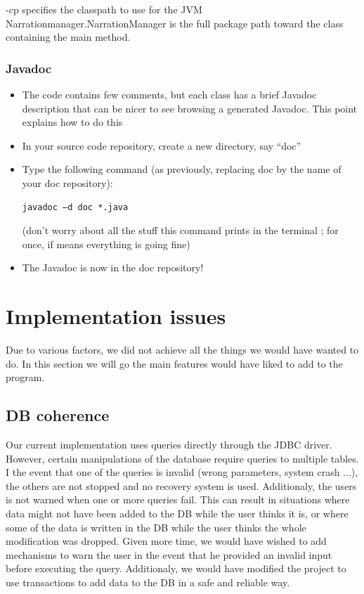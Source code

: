 \documentclass[a4paper ,12pt,french]{article}
\begin{document}
-cp specifies the classpath to use for the JVM\\

Narrationmanager.NarrationManager is the full package path toward the class containing the main method.

\subsubsection{Javadoc}


\begin{itemize}
\item The code contains few comments, but each class has a brief Javadoc description that can be nicer to see browsing a generated Javadoc. This point explains how to do this
\item In your source code repository, create a new directory, say “doc”
\item Type the following command (as previously, replacing doc by the name of your doc repository):
\begin{verbatim}
javadoc –d doc *.java
\end{verbatim}
(don’t worry about all the stuff this command prints in the terminal ; for once, if means everything is going fine)
\item The Javadoc is now in the doc repository!
\end{itemize}
\newpage

\section{Implementation issues}
Due to various factors, we did not achieve all the things we would have wanted to do. In this section we will go the main features would have liked to add to the program.

\subsection{DB coherence}
Our current implementation uses queries directly through the JDBC driver. However, certain manipulations of the database require queries to multiple tables. I the event that one of the queries is invalid (wrong parameters, system crash ...), the others are not stopped and no recovery system is used. Additionaly, the users is not warned when one or more queries fail. This can result in situations where data might not have been added to the DB while the user thinks it is, or where some of the data is written in the DB while the user thinks the whole modification was dropped.
Given more time, we would have wished to add mechanisms to warn the user in the event that he provided an invalid input before executing the query. Additionaly, we would have modified the project to use transactions to add data to the DB in a safe and reliable way.
\end{document}
